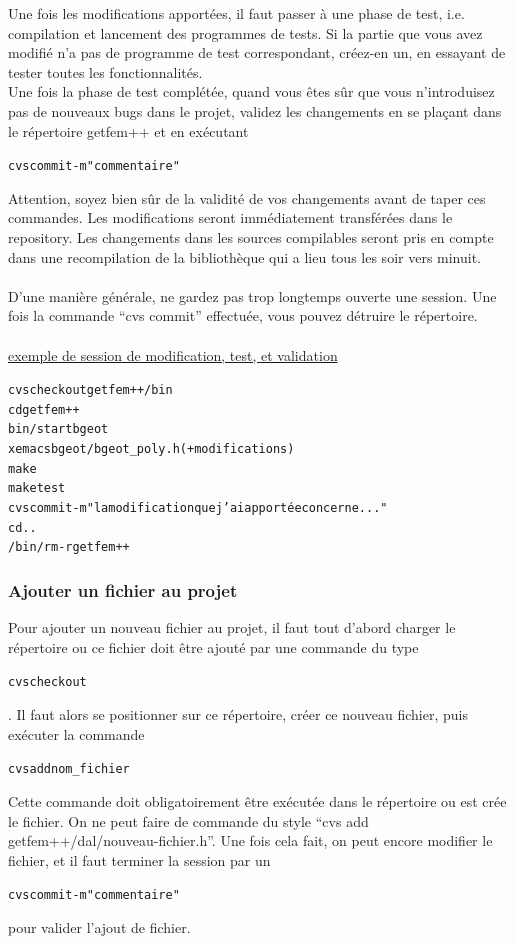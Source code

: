 \documentclass[12pt,a4paper]{../doc}
\newcommand{\rc}{{\par}}
\newcommand{\rccc}{{\par\bigskip}}
\newenvironment{largebox}
  { \rc\noindent \begin{boxedminipage}[t]{\linewidth} }
  { \end{boxedminipage}  \rccc\noindent }
\begin{document}
{Une fois les modifications apport\'ees, il faut passer \`a une phase de test, i.e. compilation et lancement des programmes de tests. Si la partie que vous avez modifi\'e n'a pas de programme de test correspondant, cr\'eez-en un, en essayant de tester toutes les fonctionnalit\'es.\\[0.4cm]

Une fois la phase de test compl\'et\'ee, quand vous \^etes s\^ur que vous n'introduisez pas de nouveaux bugs dans le projet, validez les changements en se pla\c cant dans le r\'epertoire getfem++ et en ex\'ecutant
\begin{alltt}
  cvs commit -m "commentaire"
\end{alltt}
Attention, soyez bien s\^ur de la validit\'e de vos changements avant de taper ces commandes. Les modifications seront imm\'ediatement transf\'er\'ees dans le repository. Les changements dans les sources compilables seront pris en compte dans une recompilation de la biblioth\`eque qui a lieu tous les soir vers minuit.\\ \\

D'une mani\`ere g\'en\'erale, ne gardez pas trop longtemps ouverte une session. Une fois la commande ``cvs commit'' effectu\'ee, vous pouvez d\'etruire le r\'epertoire. \\ \\

\underline{exemple de session de modification, test, et validation}
\begin{largebox}
\begin{alltt}
  cvs checkout getfem++/bin
  cd getfem++
  bin/startbgeot
  xemacs bgeot/bgeot_poly.h (+ modifications)
  make
  make test
  cvs commit -m "la modification que j'ai apport\'ee concerne ..."
  cd ..
  /bin/rm -r getfem++
\end{alltt}
\end{largebox}


\subsubsection{Ajouter un fichier au projet}

Pour ajouter un nouveau fichier au projet, il faut tout d'abord charger le r\'epertoire ou ce fichier doit \^etre ajout\'e par une commande du type \begin{alltt} cvs checkout \end{alltt}.
Il faut alors se positionner sur ce r\'epertoire, cr\'eer ce nouveau fichier, puis ex\'ecuter la commande
\begin{alltt}
  cvs add nom_fichier
\end{alltt}
Cette commande doit obligatoirement \^etre ex\'ecut\'ee dans le r\'epertoire ou est cr\'ee le fichier. On ne peut faire de commande du style ``cvs add getfem++/dal/nouveau-fichier.h''.
Une fois cela fait, on peut encore modifier le fichier, et il faut terminer la session par un
\begin{alltt}
  cvs commit -m "commentaire"
\end{alltt}
pour valider l'ajout de fichier.

}
\end{document}
